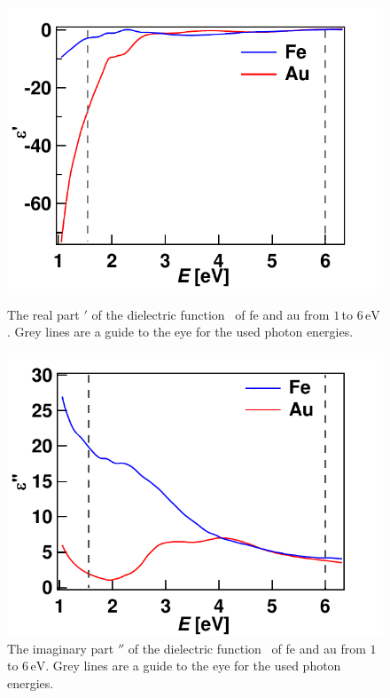 \documentclass[a4paper,12pt,twoside]{article}
\begin{document}
	\begin{figure}[H]
		\begin{minipage}[t]{.45\linewidth}
		    \includegraphics[width=\linewidth]{figures/epsilon_real_Fe_Au_energy.pdf}
			\caption{The real part \textepsilon$'$ of the dielectric function \textepsilon\, of \gls{fe} and \gls{au} from $1\,\mathrm{}$to $6\,\mathrm{eV}$. Grey lines are a guide to the eye for the used photon energies.}
			    \label{reale}
		\end{minipage}
			\hspace{.075\linewidth}
		\begin{minipage}[t]{.45\linewidth}
			\includegraphics[width=\linewidth]{figures/epsilon_imag_Fe_Au_energy.pdf}
			\caption{The imaginary part \textepsilon$''$ of the dielectric function \textepsilon\, of \gls{fe} and \gls{au} from $1\,\mathrm{}$to $6\,\mathrm{eV}$. Grey lines are a guide to the eye for the used photon energies.}
			    \label{imaginarye}
		\end{minipage}
	\end{figure}
\end{document}
